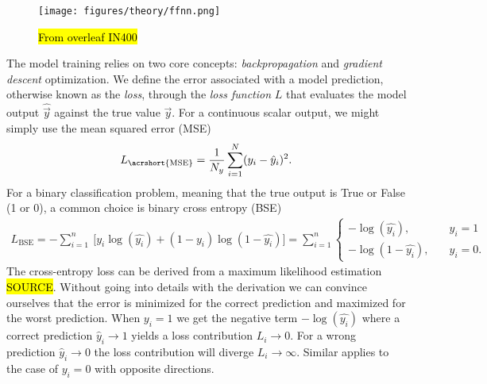 \begin{figure}[H]
  \centering
  \texttt{[image: figures/theory/ffnn.png]}
  \caption{\hl{From overleaf IN400}}
  \label{fig:ffnn}
\end{figure}


The model training relies on two core concepts: \textit{backpropagation} and \textit{gradient descent} optimization. We define the error associated with a model prediction, otherwise known as the \textit{loss}, through the \textit{loss function} $L$ that evaluates the model output  $\hat{\vec{y}}$ against the true value $\vec{y}$. For a continuous scalar output, we might simply use the mean squared error (\acrshort{MSE})
\begin{align*}
  L_{\text{\acrshort{MSE}}} = \frac{1}{N_y} \sum_{i = 1}^N (y_i - \hat{y}_i)^2.
\end{align*}
For a binary classification problem, meaning that the true output is True or False (1 or 0), a common choice is binary cross entropy (BSE)
\begin{align*}
  L_{\text{BSE}} =  -\sum_{i=1}^n \ \Big[y_i\log(\hat{y_i}) + (1-y_i)\log(1 - \hat{y_i}) \Big] =  \sum_{i=1}^n   \begin{cases}
    - \log{(\hat{y_i})},& \quad y_i = 1 \\
    -\log{(1-\hat{y_i})},& \quad y_i = 0.
\end{cases}
\end{align*}
The cross-entropy loss can be derived from a maximum likelihood estimation \hl{SOURCE}. Without going into details with the derivation we can convince ourselves that the error is minimized for the correct prediction and maximized for the worst prediction. When $y_i = 1$ we get the negative term $-\log(\hat{y_i})$ where a correct prediction $\hat{y}_i \to 1$ yields a loss contribution $L_i \to 0$. For a wrong prediction $\hat{y}_i \to 0$ the loss contribution will diverge $L_i \to \infty$. Similar applies to the case of $y_i = 0$ with opposite directions. 


